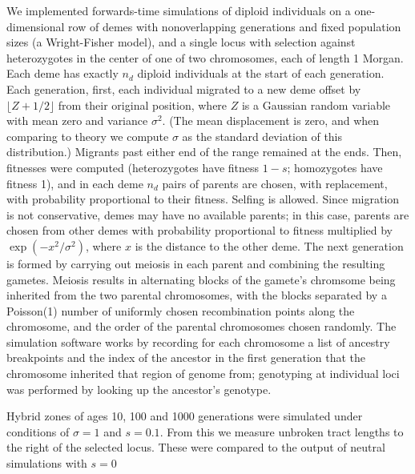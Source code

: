 \documentclass[12pt]{article}
\begin{document}
We implemented forwards-time simulations of diploid individuals on a one-dimensional row of demes
with nonoverlapping generations and fixed population sizes (a Wright-Fisher model),
and a single locus with selection against heterozygotes in the center of one of two chromosomes, each of length 1 Morgan.
Each deme has exactly $n_d$ diploid individuals at the start of each generation.
Each generation,
first, each individual migrated to a new deme offset by $\lfloor Z + 1/2 \rfloor$ from their original position,
where $Z$ is a Gaussian random variable with mean zero and variance $\sigma^2$.
(The mean displacement is zero, and when comparing to theory we compute $\sigma$ as the standard deviation of this distribution.)
Migrants past either end of the range remained at the ends.
Then, 
fitnesses were computed (heterozygotes have fitness $1-s$; homozygotes have fitness 1),
and in each deme $n_d$ pairs of parents are chosen, with replacement,
with probability proportional to their fitness.
Selfing is allowed.
Since migration is not conservative, demes may have no available parents;
in this case, parents are chosen from other demes with probability proportional to fitness
multiplied by $\exp(-x^2/\sigma^2)$, where $x$ is the distance to the other deme.
The next generation is formed by carrying out meiosis in each parent
and combining the resulting gametes.
Meiosis results in alternating blocks of the gamete's chromsome
being inherited from the two parental chromosomes,
with the blocks separated by a Poisson(1) number of uniformly chosen recombination points along the chromosome,
and the order of the parental chromosomes chosen randomly.
The simulation software works by recording for each chromosome
a list of ancestry breakpoints and the index of the ancestor in the first generation
that the chromosome inherited that region of genome from;
genotyping at individual loci was performed by looking up the ancestor's genotype.

Hybrid zones of ages 10, 100 and 1000 generations were simulated under conditions of $\sigma=1$ and $s=0.1$. From this we measure unbroken tract lengths to the right of the selected locus. These were compared to the output of neutral simulations with $s=0$
\end{document}
